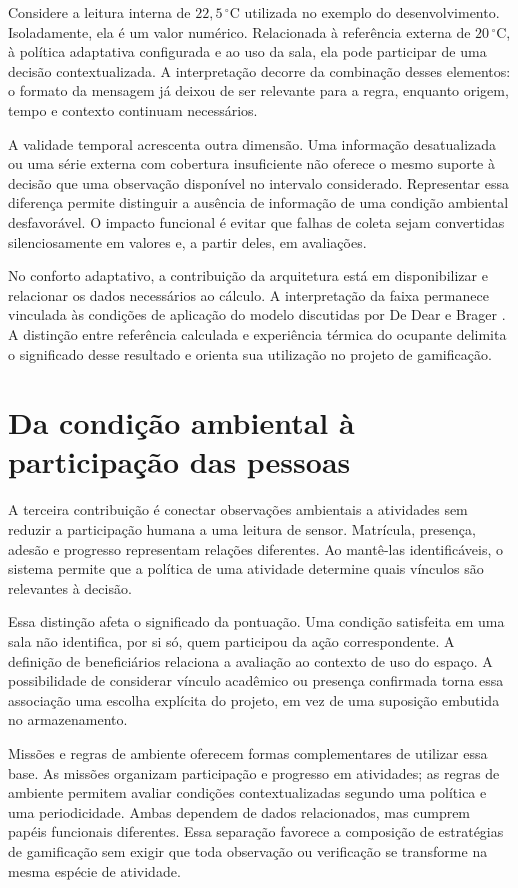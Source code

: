 \documentclass[tcc,capa]{texufpel}
\begin{document}
Considere a leitura interna de $22{,}5\,^{\circ}\mathrm{C}$ utilizada no exemplo do desenvolvimento. Isoladamente, ela é um valor numérico. Relacionada à referência externa de $20\,^{\circ}\mathrm{C}$, à política adaptativa configurada e ao uso da sala, ela pode participar de uma decisão contextualizada. A interpretação decorre da combinação desses elementos: o formato da mensagem já deixou de ser relevante para a regra, enquanto origem, tempo e contexto continuam necessários.

A validade temporal acrescenta outra dimensão. Uma informação desatualizada ou uma série externa com cobertura insuficiente não oferece o mesmo suporte à decisão que uma observação disponível no intervalo considerado. Representar essa diferença permite distinguir a ausência de informação de uma condição ambiental desfavorável. O impacto funcional é evitar que falhas de coleta sejam convertidas silenciosamente em valores e, a partir deles, em avaliações.

No conforto adaptativo, a contribuição da arquitetura está em disponibilizar e relacionar os dados necessários ao cálculo. A interpretação da faixa permanece vinculada às condições de aplicação do modelo discutidas por De Dear e Brager \cite{deDear2002}. A distinção entre referência calculada e experiência térmica do ocupante delimita o significado desse resultado e orienta sua utilização no projeto de gamificação.

\section{Da condição ambiental à participação das pessoas}
A terceira contribuição é conectar observações ambientais a atividades sem reduzir a participação humana a uma leitura de sensor. Matrícula, presença, adesão e progresso representam relações diferentes. Ao mantê-las identificáveis, o sistema permite que a política de uma atividade determine quais vínculos são relevantes à decisão.

Essa distinção afeta o significado da pontuação. Uma condição satisfeita em uma sala não identifica, por si só, quem participou da ação correspondente. A definição de beneficiários relaciona a avaliação ao contexto de uso do espaço. A possibilidade de considerar vínculo acadêmico ou presença confirmada torna essa associação uma escolha explícita do projeto, em vez de uma suposição embutida no armazenamento.

Missões e regras de ambiente oferecem formas complementares de utilizar essa base. As missões organizam participação e progresso em atividades; as regras de ambiente permitem avaliar condições contextualizadas segundo uma política e uma periodicidade. Ambas dependem de dados relacionados, mas cumprem papéis funcionais diferentes. Essa separação favorece a composição de estratégias de gamificação sem exigir que toda observação ou verificação se transforme na mesma espécie de atividade.
\end{document}
